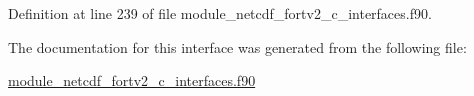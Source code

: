 Definition at line 239 of file module\+\_\+netcdf\+\_\+fortv2\+\_\+c\+\_\+interfaces.\+f90.



The documentation for this interface was generated from the following file\+:\begin{DoxyCompactItemize}
\item 
\hyperlink{module__netcdf__fortv2__c__interfaces_8f90}{module\+\_\+netcdf\+\_\+fortv2\+\_\+c\+\_\+interfaces.\+f90}\end{DoxyCompactItemize}
